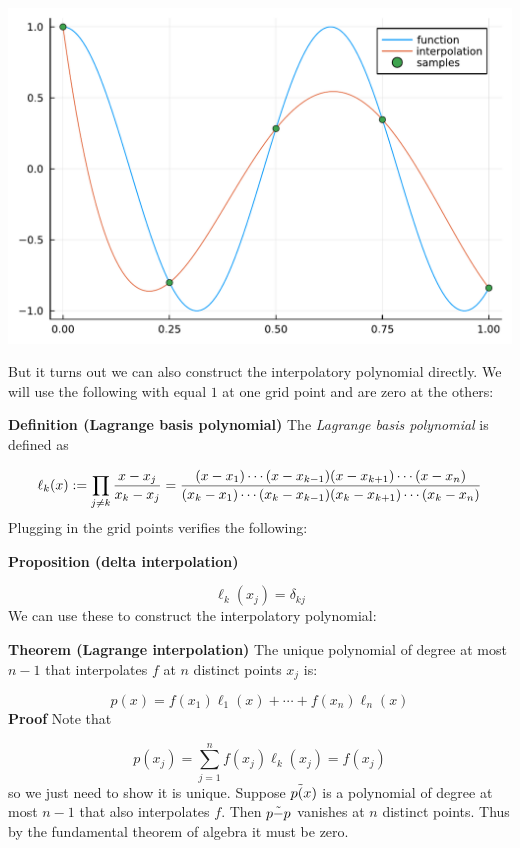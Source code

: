 \documentclass[12pt,a4paper]{article}
\begin{document}
\includegraphics[width=\linewidth]{jl_hpkPoK/OP_methods_test_21_1.pdf}

But it turns out we can also construct the interpolatory polynomial directly. We will use the following with equal $1$ at one grid point and are zero at the others:

\textbf{Definition (Lagrange basis polynomial)} The \emph{Lagrange basis polynomial} is defined as

\[
\ensuremath{\ell}_k(x) := \ensuremath{\prod}_{j \ensuremath{\ne} k} {x-x_j \over x_k - x_j} =  {(x-x_1) \ensuremath{\cdots}(x-x_{k-1})(x-x_{k+1}) \ensuremath{\cdots} (x-x_n) \over (x_k - x_1) \ensuremath{\cdots} (x_k - x_{k-1}) (x_k - x_{k+1}) \ensuremath{\cdots} (x_k - x_n)}
\]
Plugging in the grid points verifies the following:

\textbf{Proposition (delta interpolation)}

\[
\ensuremath{\ell}_k(x_j) = \ensuremath{\delta}_{kj}
\]
We can use these to construct the interpolatory polynomial:

\textbf{Theorem (Lagrange interpolation)} The unique  polynomial of degree at most $n-1$ that interpolates $f$ at $n$ distinct points $x_j$ is:

\[
p(x) = f(x_1) \ensuremath{\ell}_1(x) + \ensuremath{\cdots} + f(x_n) \ensuremath{\ell}_n(x)
\]
\textbf{Proof} Note that

\[
p(x_j) = \ensuremath{\sum}_{j=1}^n f(x_j) \ensuremath{\ell}_k(x_j) = f(x_j)
\]
so we just need to show it is unique. Suppose $p\ensuremath{\tilde}(x)$ is a  polynomial of degree at most $n-1$ that also interpolates $f$. Then $p\ensuremath{\tilde} - p$ vanishes at $n$ distinct points. Thus by the fundamental theorem of algebra it must be zero.
\end{document}
